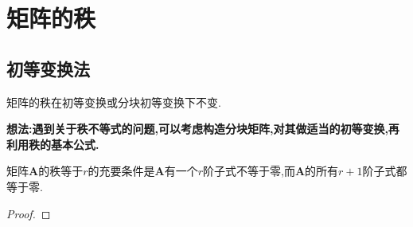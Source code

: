 \documentclass[../../main.tex]{subfiles}%
\begin{document}
\everymath{\displaystyle} %

\section{矩阵的秩}

\subsection{初等变换法}

矩阵的秩在初等变换或分块初等变换下不变.

\textbf{想法:遇到关于秩不等式的问题,可以考虑构造分块矩阵,对其做适当的初等变换,再利用秩的基本公式.}

\begin{theorem}\label{theorem:矩阵的秩与子式}
矩阵\(\boldsymbol{A}\)的秩等于\(r\)的充要条件是\(\boldsymbol{A}\)有一个\(r\)阶子式不等于零,而\(\boldsymbol{A}\)的所有\(r + 1\)阶子式都等于零.
\end{theorem}
\begin{proof}

\end{proof}
\end{document}
